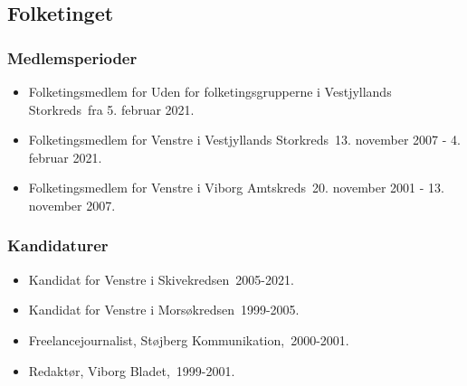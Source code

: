\documentclass[11pt, a4paper]{awesome-cv}
\begin{document}
\begin{cvletter}
\subsection*{Folketinget}
\subsubsection*{Medlemsperioder}
\begin{itemize}
\item Folketingsmedlem for Uden for folketingsgrupperne i Vestjyllands Storkreds fra 5. februar 2021.
\item Folketingsmedlem for Venstre i Vestjyllands Storkreds 13. november 2007 - 4. februar 2021.
\item Folketingsmedlem for Venstre i Viborg Amtskreds 20. november 2001 - 13. november 2007.
\end{itemize}
\subsubsection*{Kandidaturer}
\begin{itemize}
\item Kandidat for Venstre i Skivekredsen 2005-2021.
\item Kandidat for Venstre i Morsøkredsen 1999-2005.
\end{itemize}
\begin{itemize}
\item Freelancejournalist, Støjberg Kommunikation, 2000-2001.
\item Redaktør, Viborg Bladet, 1999-2001.
\end{itemize}
\end{cvletter}
\end{document}
